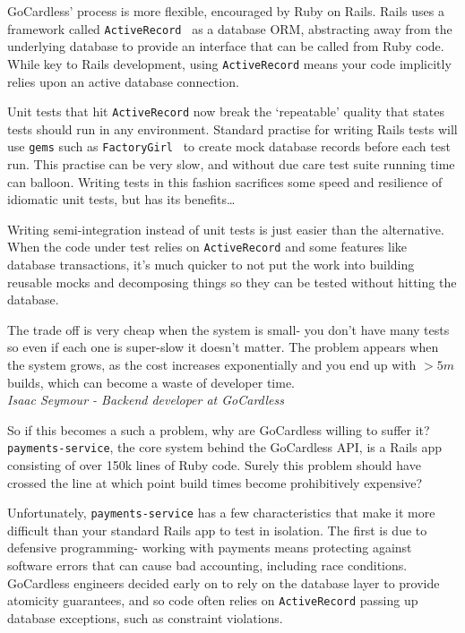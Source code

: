 \documentclass[11pt]{article}
\begin{document}
GoCardless' process is more flexible, encouraged by Ruby on Rails. Rails uses a
framework called \texttt{ActiveRecord}~\cite{activeRecord} as a database ORM,
abstracting away from the underlying database to provide an interface that can
be called from Ruby code. While key to Rails development, using
\texttt{ActiveRecord} means your code implicitly relies upon an active database
connection.

Unit tests that hit \texttt{ActiveRecord} now break the `repeatable' quality
that states tests should run in any environment. Standard practise for writing
Rails tests will use \texttt{gems} such as
\texttt{FactoryGirl}~\cite{factoryGirl} to create mock database records before
each test run. This practise can be very slow, and without due care test suite
running time can balloon. Writing tests in this fashion sacrifices some speed
and resilience of idiomatic unit tests, but has its benefits\dots

\begin{displayquote}

  Writing semi-integration instead of unit tests is just easier than the
  alternative. When the code under test relies on \texttt{ActiveRecord} and some
  features like database transactions, it's much quicker to not put the work
  into building reusable mocks and decomposing things so they can be tested
  without hitting the database.

  The trade off is very cheap when the system is small- you don't have many
  tests so even if each one is super-slow it doesn't matter. The problem appears
  when the system grows, as the cost increases exponentially and you end up with
  $>5m$ builds, which can become a waste of developer time. \\

  \textit{Isaac Seymour - Backend developer at GoCardless}

\end{displayquote}

So if this becomes a such a problem, why are GoCardless willing to suffer it?
\texttt{payments-service}, the core system behind the GoCardless API, is a Rails
app consisting of over 150k lines of Ruby code. Surely this problem should have
crossed the line at which point build times become prohibitively expensive?

Unfortunately, \texttt{payments-service} has a few characteristics that make it
more difficult than your standard Rails app to test in isolation. The first is
due to defensive programming- working with payments means protecting against
software errors that can cause bad accounting, including race conditions.
GoCardless engineers decided early on to rely on the database layer to provide
atomicity guarantees, and so code often relies on \texttt{ActiveRecord} passing
up database exceptions, such as constraint violations.
\end{document}
